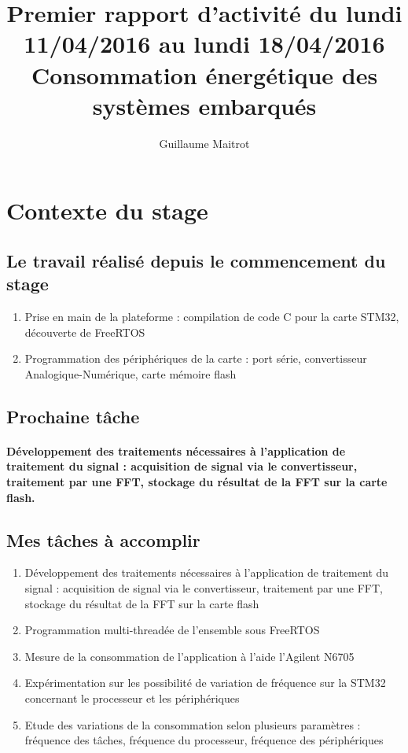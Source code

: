 \documentclass[a4paper]{article}
\title{Premier rapport d'activité du lundi 11/04/2016 au lundi 18/04/2016 }
\author{Guillaume Maitrot}
\begin{document}
\maketitle

\begin{center}
\centering
\title{Consommation énergétique des systèmes embarqués}
\end{center}

\section{Contexte du stage}

 \subsection{Le travail réalisé depuis le commencement du stage}
 \begin{enumerate}
\item {Prise en main de la plateforme : compilation de code C pour la carte STM32, découverte de FreeRTOS}
\item {Programmation des périphériques de la carte : port série,
convertisseur Analogique-Numérique, carte mémoire flash}
\end{enumerate}

 \subsection{Prochaine tâche}
    \paragraph{Développement des traitements nécessaires à l'application de
traitement du signal : acquisition de signal via le convertisseur,
traitement par une FFT, stockage du résultat de la FFT sur la carte
flash.}
    
\subsection{Mes tâches à accomplir}
\begin{enumerate}
\item {Développement des traitements nécessaires à l'application de
traitement du signal : acquisition de signal via le convertisseur,
traitement par une FFT, stockage du résultat de la FFT sur la carte
flash}
\item { Programmation multi-threadée de l'ensemble sous FreeRTOS}
\item {Mesure de la consommation de l'application à l'aide l'Agilent
N6705}
\item {Expérimentation sur les possibilité de variation de fréquence sur la
STM32 concernant le processeur et les périphériques}
\item {Etude des variations de la consommation selon plusieurs paramètres :
fréquence des tâches, fréquence du processeur, fréquence des
périphériques}
\end{enumerate}
\end{document}
